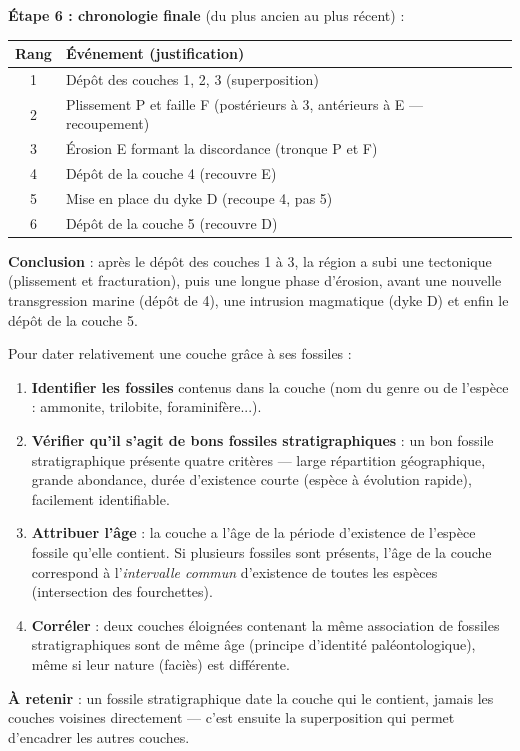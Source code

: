 \documentclass[11pt]{article}
\newcommand{\cle}[1]{{\popxbold\color{popdark}#1}}
\begin{document}
\begin{exoresolu}
\textbf{Étape 6 : chronologie finale} (du plus ancien au plus récent) :
\begin{center}
\begin{tabularx}{\linewidth}{|c|X|}\hline
\rowcolor{popblueL} \textbf{Rang} & \textbf{Événement (justification)} \\ \hline
1 & Dépôt des couches 1, 2, 3 (superposition) \\ \hline
2 & Plissement P et faille F (postérieurs à 3, antérieurs à E — recoupement) \\ \hline
3 & Érosion E formant la discordance (tronque P et F) \\ \hline
4 & Dépôt de la couche 4 (recouvre E) \\ \hline
5 & Mise en place du dyke D (recoupe 4, pas 5) \\ \hline
6 & Dépôt de la couche 5 (recouvre D) \\ \hline
\end{tabularx}
\end{center}
\textbf{Conclusion} : après le dépôt des couches 1 à 3, la région a subi une tectonique (plissement et fracturation), puis une longue phase d'érosion, avant une nouvelle transgression marine (dépôt de 4), une intrusion magmatique (dyke D) et enfin le dépôt de la couche 5.
\end{exoresolu}

\begin{methode}
Pour dater relativement une couche grâce à ses fossiles :
\begin{enumerate}
\item \textbf{Identifier les fossiles} contenus dans la couche (nom du genre ou de l'espèce : ammonite, trilobite, foraminifère...).
\item \textbf{Vérifier qu'il s'agit de bons fossiles stratigraphiques} : un bon fossile stratigraphique présente quatre critères — large répartition géographique, grande abondance, durée d'existence courte (espèce à évolution rapide), facilement identifiable.
\item \textbf{Attribuer l'âge} : la couche a l'âge de la période d'existence de l'espèce fossile qu'elle contient. Si plusieurs fossiles sont présents, l'âge de la couche correspond à l'\emph{intervalle commun} d'existence de toutes les espèces (intersection des fourchettes).
\item \textbf{Corréler} : deux couches éloignées contenant la même association de fossiles stratigraphiques sont de même âge (\cle{principe d'identité paléontologique}), même si leur nature (faciès) est différente.
\end{enumerate}
\textbf{À retenir} : un fossile stratigraphique date la couche qui le contient, jamais les couches voisines directement — c'est ensuite la superposition qui permet d'encadrer les autres couches.
\end{methode}
\end{document}
